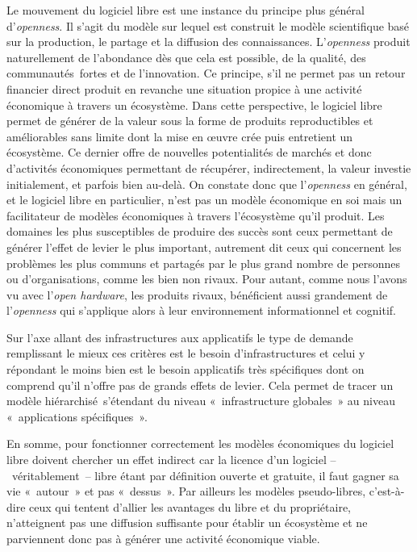 \documentclass{FramateX}
\begin{document}
\begin{refsection}
Le mouvement du logiciel libre est une instance du principe plus général
d'\textit{openness}. Il s'agit du modèle sur lequel est construit le
modèle scientifique basé sur la production, le partage et la diffusion
des connaissances. L'\textit{openness} produit naturellement de
l'abondance dès que cela est possible, de la qualité, des
communautés~fortes et de l'innovation. Ce principe,
s'il ne permet pas un retour financier direct produit
en revanche une situation propice à une activité économique à travers
un écosystème. Dans cette perspective, le logiciel libre permet de
générer de la valeur sous la forme de produits reproductibles et
améliorables sans limite dont la mise en œuvre crée puis entretient un
écosystème. Ce dernier offre de nouvelles potentialités de marchés et
donc d'activités économiques permettant de récupérer, indirectement, la
valeur investie initialement, et parfois bien au-delà. On constate donc
que l'\textit{openness} en général, et le logiciel
libre en particulier, n'est pas un modèle économique en soi mais un
facilitateur de modèles économiques à travers
l'écosystème qu'il produit. Les
domaines les plus susceptibles de produire des succès sont ceux
permettant de générer l'effet de levier le plus important, autrement
dit ceux qui concernent les problèmes les plus communs et partagés par
le plus grand nombre de personnes ou d'organisations,
comme les bien non rivaux. Pour autant, comme nous
l'avons vu avec l'\textit{open
hardware}, les produits rivaux, bénéficient aussi grandement de
l'\textit{openness} qui s'applique
alors à leur environnement informationnel et cognitif.

Sur l'axe allant des infrastructures aux applicatifs le
type de demande remplissant le mieux ces critères est le besoin
d'infrastructures et celui y répondant le moins bien est le besoin
applicatifs très spécifiques dont on comprend qu'il
n'offre pas de grands effets de levier. Cela permet de
tracer un modèle hiérarchisé~s'étendant du niveau «~infrastructure
globales~» au niveau «~applications spécifiques~».

En somme, pour fonctionner correctement les modèles économiques du
logiciel libre doivent chercher un effet indirect car la licence d'un
logiciel --~véritablement~-- libre étant par définition ouverte et
gratuite, il faut gagner sa vie «~autour~» et pas «~dessus~». Par
ailleurs les modèles pseudo-libres, c'est-à-dire ceux qui tentent
d'allier les avantages du libre et du propriétaire,
n'atteignent pas une diffusion suffisante pour établir
un écosystème et ne parviennent donc pas à générer une activité
économique viable.


\end{refsection}
\end{document}
